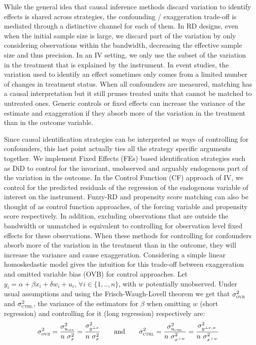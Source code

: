 			While the general idea that causal inference methods discard variation to identify effects is shared across strategies, the confounding / exaggeration trade-off is mediated through a distinctive channel for each of them. In RD designs, even when the initial sample size is large, we discard part of the variation by only considering observations within the bandwidth, decreasing the effective sample size and thus precision. In an IV setting, we only use the subset of the variation in the treatment that is explained by the instrument. In event studies, the variation used to identify an effect sometimes only comes from a limited number of changes in treatment status. When all confounders are measured, matching has a causal interpretation but it still prunes treated units that cannot be matched to untreated ones. Generic controls or fixed effects can increase the variance of the estimate and exaggeration if they absorb more of the variation in the treatment than in the outcome variable. 
			
			Since causal identification strategies can be interpreted as ways of controlling for confounders, this last point actually ties all the strategy specific arguments together. We implement Fixed Effects (FEs) based identification strategies such as DiD to control for the invariant, unobserved and arguably endogenous part of the variation in the outcome. In the Control Function (CF) approach of IV, we control for the predicted residuals of the regression of the endogenous variable of interest on the instrument. Fuzzy-RD and propensity score matching can also be thought of as control function approaches, of the forcing variable and propensity score respectively. In addition, excluding observations that are outside the bandwidth or unmatched is equivalent to controlling for observation level fixed effects for these observations. When these methods for controlling for confounders absorb more of the variation in the treatment than in the outcome, they will increase the variance and cause exaggeration. Considering a simple linear homoskedastic model gives the intuition for this trade-off between exaggeration and omitted variable bias (OVB) for control approaches.  Let $y_{i} = \alpha + \beta x_{i} + \delta w_{i} + u_{i}$, $\forall i \in \{1, .., n\}$,  with $w$ potentially unobserved. Under usual assumptions and using the Frisch-Waugh-Lovell theorem we get that $ \sigma_{\textsc{ovb}}^2$ and $ \sigma_{\textsc{ctrl}}^2$, the variance of the estimators for $\beta$ when omitting $w$ (short regression) and controlling for it (long regression) respectively are:
			~
			\[
				\sigma_{\textsc{ovb}}^2 =
				 \dfrac{\sigma^{2}_{u_{\textsc{ovb}}}}{n \ \sigma_{x}^{2}} =
				 \dfrac{\sigma^{2}_{y^{\perp x}}}{n \ \sigma_{x}^{2}}
				 \qquad \text{and} \qquad
				 \sigma_{\textsc{ctrl}}^2 = 
				 \dfrac{\sigma^{2}_{u_{\textsc{ctrl}}}}{n \ \sigma_{x^{\perp w}}^{2}} =
				  \dfrac{\sigma^{2}_{y^{\perp x, w}}}{n \ \sigma_{x^{\perp w}}^{2}}
			\]
			
